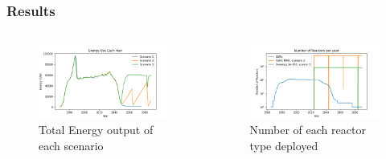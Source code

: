 \begin{frame}
\frametitle{Results}
    \begin{columns}
      \column[t]{5cm}
      \begin{figure}[t!]
          \includegraphics[scale=0.25, trim=0 5 0 10,clip]{figures/energy_all.png}
          \caption{Total Energy output of each scenario}
          \label{fig:energy}
      \end{figure}
      \begin{figure}[h]
          \includegraphics[scale=0.25, trim=0 5 0 10,clip]{figures/rx_deployment_all.png}
          \caption{Number of each reactor type deployed}
          \label{fig:ex_deployment}
      \end{figure}
  

\end{columns}
\end{frame}
